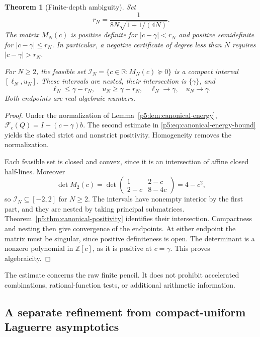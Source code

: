 \documentclass[11pt,a4paper]{article}
\newtheorem{theorem}{Theorem}[section]
\theoremstyle{definition}
\theoremstyle{remark}
\numberwithin{equation}{section}
\begin{document}
\begin{theorem}[Finite-depth ambiguity]\label{p5:thm:canonical-radius}
Set
\[
 r_N=\frac1{8N\sqrt{1+1/(4N)}}.
\]
The matrix $M_N(c)$ is positive definite for $|c-\gamma|<r_N$
and positive semidefinite for $|c-\gamma|\leq r_N$.
In particular, a negative certificate of degree less than $N$
requires $|c-\gamma|>r_N$.

For $N\geq2$, the feasible set
$\mathcal I_N=\{c\in\mathbb R:M_N(c)\succeq0\}$ is a compact
interval $[\ell_N,u_N]$.  These intervals are nested, their
intersection is $\{\gamma\}$, and
\begin{equation}\label{p5:eq:canonical-endpoints}
 \ell_N\leq\gamma-r_N,\quad
 u_N\geq\gamma+r_N,\quad
 \ell_N\longrightarrow\gamma,\quad u_N\longrightarrow\gamma.
\end{equation}
Both endpoints are real algebraic numbers.
\end{theorem}
\begin{proof}
Under the normalization of Lemma~\ref{p5:lem:canonical-energy},
$\mathcal F_c(Q)=I-(c-\gamma)b$.  The second estimate in
\eqref{p5:eq:canonical-energy-bound} yields the stated strict and
nonstrict positivity.  Homogeneity removes the normalization.

Each feasible set is closed and convex, since it is an intersection
of affine closed half-lines.  Moreover
\[
 \det M_2(c)=
 \det\begin{pmatrix}1&2-c\\2-c&8-4c\end{pmatrix}=4-c^2,
\]
so $\mathcal I_N\subseteq[-2,2]$ for $N\geq2$.
The intervals have nonempty interior by the first part, and they
are nested by taking principal submatrices.
Theorem~\ref{p5:thm:canonical-positivity} identifies their intersection.
Compactness and nesting then give convergence of the endpoints.
At either endpoint the matrix must be singular, since positive
definiteness is open.  The determinant is a nonzero polynomial
in $\mathbb Z[c]$, as it is positive at $c=\gamma$.
This proves algebraicity.
\end{proof}

The estimate concerns the raw finite pencil.  It does not prohibit
accelerated combinations, rational-function tests, or additional
arithmetic information.

\subsection{A separate refinement from compact-uniform Laguerre asymptotics}
\end{document}
